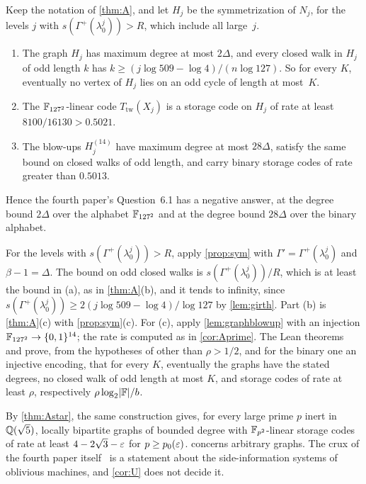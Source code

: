 \begin{corollary}[Corollary U]\label{cor:U}
Keep the notation of \cref{thm:A}, and let $H_j$ be the symmetrization of $N_j$, for the levels $j$ with
$s(\Gamma^+(\lambda_0^j))>R$, which include all large~$j$.
\begin{enumerate}[label=(\alph*)]
\item The graph $H_j$ has maximum degree at most $2\Delta$, and every closed walk in $H_j$ of odd length $k$ has
$k\ge(j\log509-\log4)/(n\log127)$. So for every $K$, eventually no vertex of $H_j$ lies on an odd cycle of length at
most~$K$.
\item The $\mathbb{F}_{127^2}$-linear code $T_{\mathrm{tw}}(X_j)$ is a storage code on $H_j$ of rate at least $8100/16130>0.5021$.
\item The blow-ups $H_j^{(14)}$ have maximum degree at most $28\Delta$, satisfy the same bound on closed walks of odd
length, and carry binary storage codes of rate greater than $0.5013$.
\end{enumerate}
Hence the fourth paper's Question~6.1 has a negative answer, at the degree bound $2\Delta$ over the alphabet $\mathbb{F}_{127^2}$ and at the
degree bound $28\Delta$ over the binary alphabet.
\end{corollary}
\begin{outline}
For the levels with $s(\Gamma^+(\lambda_0^j))>R$, apply \cref{prop:sym} with $\Gamma'=\Gamma^+(\lambda_0^j)$ and
$\beta-1=\Delta$. The bound on odd closed walks is $s(\Gamma^+(\lambda_0^j))/R$, which is at least the bound in (a), as in
\cref{thm:A}(b), and it tends to infinity, since $s(\Gamma^+(\lambda_0^j))\ge2(j\log509-\log4)/\log127$ by
\cref{lem:girth}. Part (b) is \cref{thm:A}(c) with \cref{prop:sym}(c). For (c), apply \cref{lem:graphblowup} with an
injection $\mathbb{F}_{127^2}\to\{0,1\}^{14}$; the rate is computed as in \cref{cor:Aprime}. The Lean theorems
 and  prove, from the hypotheses of
 other than $\rho>1/2$, and for the binary one an injective encoding, that for every $K$, eventually the graphs have the stated degrees, no closed walk of
odd length at most $K$, and storage codes of rate at least $\rho$, respectively $\rho\log_2\lvert \mathbb{F} \rvert/b$.
\end{outline}

By \cref{thm:Astar}, the same construction gives, for every large prime $p$ inert in $\mathbb{Q}(\sqrt5)$, locally bipartite graphs
of bounded degree with $\mathbb{F}_{p^2}$-linear storage codes of rate at least $4-2\sqrt3-\varepsilon$ for $p\ge p_0(\varepsilon)$.  concerns arbitrary
graphs. The crux of the fourth paper itself~\cite[Definition~4.8]{CurvedMotion2026} is a statement about the
side-information systems of oblivious machines, and \cref{cor:U} does not decide it.
